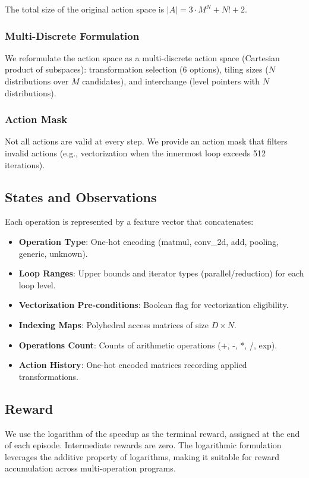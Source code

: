 \documentclass[10pt,twocolumn]{article}
\begin{document}
The total size of the original action space is $|A| = 3 \cdot M^N + N! + 2$.

\subsubsection{Multi-Discrete Formulation}
We reformulate the action space as a multi-discrete action space (Cartesian product of subspaces): transformation selection (6 options), tiling sizes ($N$ distributions over $M$ candidates), and interchange (level pointers with $N$ distributions).

\subsubsection{Action Mask}
Not all actions are valid at every step. We provide an action mask that filters invalid actions (e.g., vectorization when the innermost loop exceeds 512 iterations).

\subsection{States and Observations}
\label{sec:states}

Each operation is represented by a feature vector that concatenates:
\begin{itemize}
\item \textbf{Operation Type}: One-hot encoding (matmul, conv\_2d, add, pooling, generic, unknown).
\item \textbf{Loop Ranges}: Upper bounds and iterator types (parallel/reduction) for each loop level.
\item \textbf{Vectorization Pre-conditions}: Boolean flag for vectorization eligibility.
\item \textbf{Indexing Maps}: Polyhedral access matrices of size $D \times N$.
\item \textbf{Operations Count}: Counts of arithmetic operations (+, -, *, /, exp).
\item \textbf{Action History}: One-hot encoded matrices recording applied transformations.
\end{itemize}

\subsection{Reward}
\label{sec:reward}

We use the logarithm of the speedup as the terminal reward, assigned at the end of each episode. Intermediate rewards are zero. The logarithmic formulation leverages the additive property of logarithms, making it suitable for reward accumulation across multi-operation programs.
\end{document}
